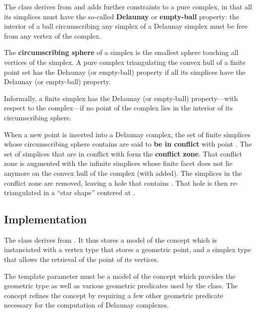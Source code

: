 {{The class  derives from
 and adds further constraints to a
pure complex, in that all its simplices must have the so-called
\textbf{Delaunay} or \textbf{empty-ball} property: the interior of a ball
circumscribing any simplex of a Delaunay simplex must be free from any vertex
of the complex.

The \textbf{circumscribing sphere} of a simplex  is the smallest sphere
touching all vertices of the simplex. A pure complex triangulating the convex
hull of a finite point set has the Delaunay (or empty-ball) property if all
its simplices have the Delaunay (or empty-ball) property.

Informally, a finite simplex has the Delaunay (or empty-ball) property---with
respect to the complex---if no point of the complex lies in the interior of
its circumscribing sphere.

When a new point  is inserted into a Delaunay complex, the set of
finite simplices whose circumscribing sphere contains  are said to
\textbf{be in conflict} with point . The set of simplices that are in
conflict with  form the \textbf{conflict zone}. That conflict zone is
augmented with the infinite simplices whose finite facet does not lie
anymore on the convex hull of the complex (with  added). The simplices
in the conflict zone are removed, leaving a hole that contains . That
hole is then re-triangulated in a ``star shape'' centered at .


\subsection{Implementation}

The class  derives from
. It thus stores a model  of
the concept  which is instanciated with a vertex
type that stores a geometric point, and a simplex type that allows the
retrieval of the point of its vertices.

The template parameter  must be a model of the concept
 which provides the geometric  type as
well as various geometric predicates used by the  class.
The concept  refines the concept
 by requiring a few other geometric predicate necessary
for the computation of Delaunay complexes.

}}
